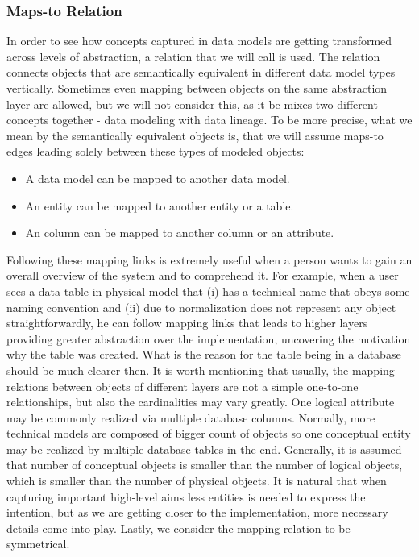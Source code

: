 \subsubsection{Maps-to Relation}

In order to see how concepts captured in data models are getting transformed across levels of abstraction, a relation that we will call  is used. The relation connects objects that are semantically equivalent in different data model types vertically.
Sometimes even mapping between objects on the same abstraction layer are allowed, but we will not consider this, as it be mixes two different concepts together - data modeling with data lineage. To be more precise, what we mean by the semantically equivalent objects is, that we will assume maps-to edges leading solely between these types of modeled objects: 
\begin{itemize}
	\item A data model can be mapped to another data model.
	\item An entity can be mapped to another entity or a table.
	\item An column can be mapped to another column or an attribute.
\end{itemize}
Following these mapping links is extremely useful when a person wants to gain an overall overview of the system and to comprehend it. For example, when a user sees a data table in physical model that (i) has a technical name that obeys some naming convention and (ii) due to normalization does not represent any object straightforwardly, he can follow mapping links that leads to higher layers providing greater abstraction over the implementation, uncovering the motivation why the table was created. What is the reason for the table being in a database should be much clearer then.
It is worth mentioning that usually, the mapping relations between objects of different layers are not a simple one-to-one relationships, but also the cardinalities may vary greatly. One logical attribute may be commonly realized via multiple database columns.
Normally, more technical models are composed of bigger count of objects so one conceptual entity may be realized by multiple database tables in the end. Generally, it is assumed that number of conceptual objects is smaller than the number of logical objects, which is smaller than the number of physical objects. It is natural that when capturing important high-level aims less entities is needed to express the intention, but as we are getting closer to the implementation, more necessary details come into play.
Lastly, we consider the mapping relation to be symmetrical.

